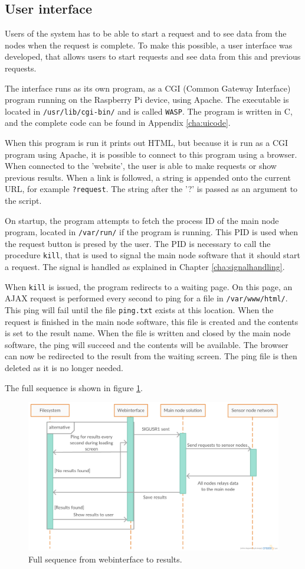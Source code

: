 \subsection{User interface} \label{cha:webinterface}
Users of the system has to be able to start a request and to see data from the nodes when the request is complete. To make this possible, a user interface was developed, that allows users to start requests and see data from this and previous requests.

The interface runs as its own program, as a CGI (Common Gateway Interface) program running on the Raspberry Pi device, using Apache. The executable is located in \texttt{/usr/lib/cgi-bin/} and is called \texttt{WASP}. The program is written in C, and the complete code can be found in Appendix \ref{cha:uicode}.

When this program is run it prints out HTML, but because it is run as a CGI program using Apache, it is possible to connect to this program using a browser. When connected to the 'website', the user is able to make requests or show previous results. When a link is followed, a string is appended onto the current URL, for example \texttt{?request}. The string after the '?' is passed as an argument to the script.

On startup, the program attempts to fetch the process ID of the main node program, located in \texttt{/var/run/} if the program is running. This PID is used when the request button is presed by the user. The PID is necessary to call the procedure \texttt{kill}, that is used to signal the main node software that it should start a request. The signal is handled as explained in Chapter \ref{cha:signalhandling}.

When \texttt{kill} is issued, the program redirects to a waiting page. On this page, an AJAX request is performed every second to ping for a file in \texttt{/var/www/html/}. This ping will fail until the file \texttt{ping.txt} exists at this location. When the request is finished in the main node software, this file is created and the contents is set to the result name. When the file is written and closed by the main node software, the ping will succeed and the contents will be available. The browser can now be redirected to the result from the waiting screen. The ping file is then deleted as it is no longer needed.

The full sequence is shown in figure \ref{fig:sigsequence}.
\begin{figure}[h!]
\centering
\includegraphics[width=1.1\textwidth]{chapters/implementation/figures/sigsequence.png}
\caption{Full sequence from webinterface to results\cite{creately}.}
\label{fig:sigsequence}
\end{figure}